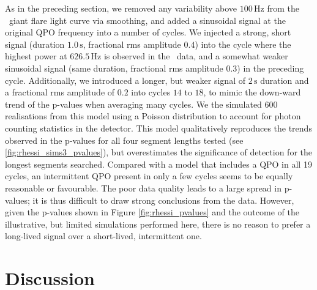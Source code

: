 \documentclass{emulateapj}
\begin{document}
As in the preceding section, we removed any variability above $100 \,\mathrm{Hz}$ from the \rhessi\ giant flare light curve via smoothing, and added a sinusoidal signal at the original QPO frequency into a number of cycles.
We injected a strong, short signal (duration $1.0 \,\mathrm{s}$, fractional rms amplitude $0.4$) into the cycle where the highest power at $626.5 \,\mathrm{Hz}$ is observed in the \rhessi\ data, and a somewhat weaker sinusoidal signal (same duration, fractional rms amplitude $0.3$) in the preceding cycle.
Additionally, we introduced a longer, but weaker signal of $2\,\mathrm{s}$ duration and a fractional rms amplitude of $0.2$ into cycles $14$ to $18$, to mimic the down-ward trend of the p-values when averaging many cycles. We the simulated $600$ realisations from this model using a Poisson distribution to account for photon counting statistics in the detector.
This model qualitatively reproduces the trends observed in the p-values for all four segment lengths tested (see \ref{fig:rhessi_sims3_pvalues}), but overestimates the significance of detection for the longest segments searched. Compared with a model that includes a QPO in all 19 cycles, an intermittent QPO present in only a few cycles seems to be equally reasonable or favourable. The poor data quality leads to a large spread in p-values; it is thus difficult to draw strong conclusions from the data. However, given the p-values shown in Figure \ref{fig:rhessi_pvalues} and the outcome of the illustrative, but limited simulations performed here, there is no reason to prefer a long-lived signal over a short-lived, intermittent one.


\section{Discussion}
\label{sec:discussion}
\end{document}
